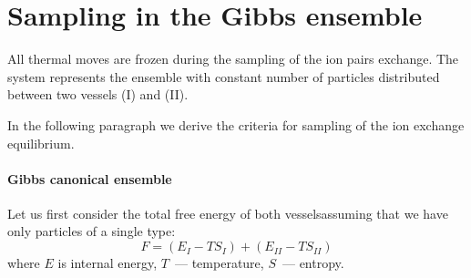 \documentclass{elsarticle}
\begin{document}
\section{Sampling in the Gibbs ensemble\label{sec: sampling the gibbs ensemble}}
All thermal moves are frozen during the sampling of the ion pairs exchange.
The system represents the ensemble with constant number of particles distributed between two vessels (I) and (II).

In the following paragraph we derive the criteria for sampling of the ion exchange equilibrium.
\paragraph{Gibbs canonical ensemble}
Let us first consider the total free energy of both vesselsassuming that we have only particles of a single type:
\begin{equation}
    F=\left(E_{I}-TS_{I}\right) + \left(E_{II}-TS_{II}\right) \label{eq:F-gibbs}
\end{equation}
where $E$ is internal energy, $T$~--- temperature, $S$~--- entropy.
\end{document}
